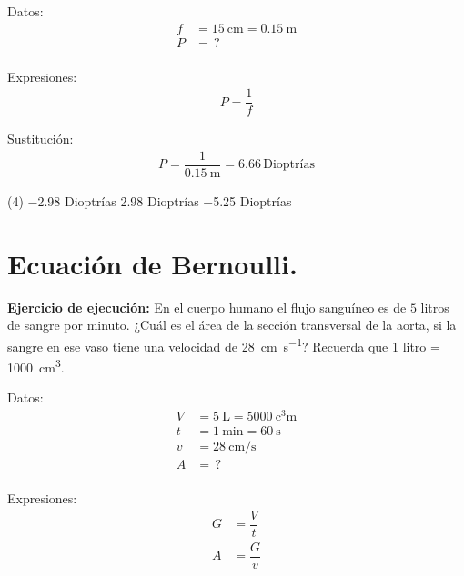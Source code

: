 \documentclass[12pt, letter]{exam}
\begin{document}
\begin{questions}
    \begin{minipage}[t]{0.35\linewidth}
    Datos: 
    \begin{align*}
    f &= \SI{15}{\centi\meter} = \SI{0.15}{\meter} \\
    P &= \, ? \\
    \end{align*}
    \end{minipage}
    \hspace{1cm}
    \begin{minipage}[t]{0.4\linewidth}
    Expresiones:
    \begin{align*}
    P = \dfrac{1}{f}
    \end{align*}
    \end{minipage}

    Sustitución:
    \begin{align*}
    P = \dfrac{1}{\SI{0.15}{\meter}} = 6.66 \, \text{Dioptrías}
    \end{align*}

    \vspace{0.3cm}
    \begin{tasks}(4)
        \task \num{-2.98} Dioptrías
        \task \num{2.98} Dioptrías
        \task {}
        \task \num{-5.25} Dioptrías
    \end{tasks}

    \setcounter{section}{9}
    \section{Ecuación de Bernoulli.}

    \setcounter{question}{23} \question \label{Problema_01} \textbf{Ejercicio de ejecución: } En el cuerpo humano el flujo sanguíneo es de $5$ litros de sangre por minuto. ¿Cuál es el área de la sección transversal de la aorta, si la sangre en ese vaso tiene una velocidad de \SI{28}{\centi\meter\per\second}? Recuerda que 1 litro = \SI{1000}{\cubic\centi\meter}.

    \begin{minipage}[t]{0.35\linewidth}
    Datos: 
    \begin{align*}
    V &= \SI{5}{\liter} = \SI{5000}{\cubic\centi\meter} \\[0.3em]
    t &= \SI{1}{\minute} = \SI{60}{\second} \\[0.3em]
    v &= \SI{28}{\centi\meter\per\second} \\
    A &= \, ? \\
    \end{align*}
    \end{minipage}
    \hspace{1cm}
    \begin{minipage}[t]{0.4\linewidth}
    Expresiones:
    \begin{align*}
    G &= \dfrac{V}{t} \\[0.3em]
    A &= \dfrac{G}{v}
    \end{align*}
    \end{minipage}


\end{questions}
\end{document}
